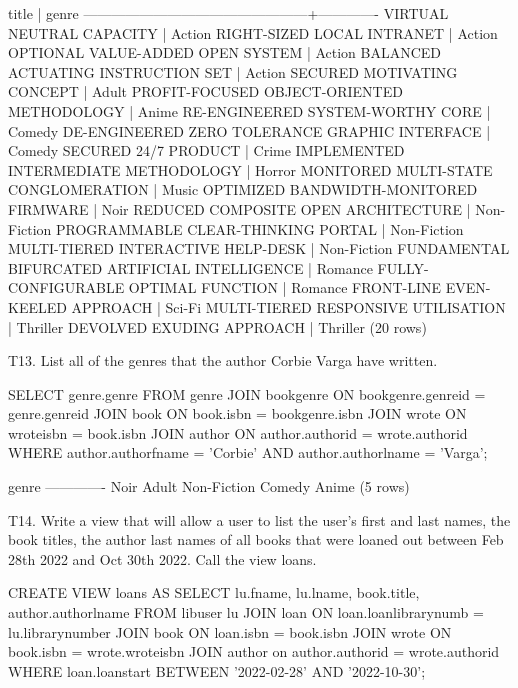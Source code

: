 \begin{pseudo}
                     title                      |    genre
------------------------------------------------+-------------
 VIRTUAL NEUTRAL CAPACITY                       | Action
 RIGHT-SIZED LOCAL INTRANET                     | Action
 OPTIONAL VALUE-ADDED OPEN SYSTEM               | Action
 BALANCED ACTUATING INSTRUCTION SET             | Action
 SECURED MOTIVATING CONCEPT                     | Adult
 PROFIT-FOCUSED OBJECT-ORIENTED METHODOLOGY     | Anime
 RE-ENGINEERED SYSTEM-WORTHY CORE               | Comedy
 DE-ENGINEERED ZERO TOLERANCE GRAPHIC INTERFACE | Comedy
 SECURED 24/7 PRODUCT                           | Crime
 IMPLEMENTED INTERMEDIATE METHODOLOGY           | Horror
 MONITORED MULTI-STATE CONGLOMERATION           | Music
 OPTIMIZED BANDWIDTH-MONITORED FIRMWARE         | Noir
 REDUCED COMPOSITE OPEN ARCHITECTURE            | Non-Fiction
 PROGRAMMABLE CLEAR-THINKING PORTAL             | Non-Fiction
 MULTI-TIERED INTERACTIVE HELP-DESK             | Non-Fiction
 FUNDAMENTAL BIFURCATED ARTIFICIAL INTELLIGENCE | Romance
 FULLY-CONFIGURABLE OPTIMAL FUNCTION            | Romance
 FRONT-LINE EVEN-KEELED APPROACH                | Sci-Fi
 MULTI-TIERED RESPONSIVE UTILISATION            | Thriller
 DEVOLVED EXUDING APPROACH                      | Thriller
(20 rows)
\end{pseudo}

T13. List all of the genres that the author Corbie Varga have written.
\begin{sql}
SELECT genre.genre FROM genre
JOIN bookgenre ON bookgenre.genreid = genre.genreid
JOIN book ON book.isbn = bookgenre.isbn
JOIN wrote ON wroteisbn = book.isbn
JOIN author ON author.authorid = wrote.authorid
WHERE author.authorfname = 'Corbie' AND author.authorlname = 'Varga';
\end{sql}

\begin{pseudo}
    genre
-------------
 Noir
 Adult
 Non-Fiction
 Comedy
 Anime
(5 rows)
\end{pseudo}

T14. Write a view that will allow a user to list the user's first and last names, the book titles, the author last names of all books that were loaned out between Feb 28th 2022 and Oct 30th 2022. Call the view loans.

\begin{sql}
CREATE VIEW loans AS 
SELECT lu.fname, lu.lname, book.title, author.authorlname FROM libuser lu 
JOIN loan ON loan.loanlibrarynumb = lu.librarynumber
JOIN book ON loan.isbn = book.isbn
JOIN wrote ON book.isbn = wrote.wroteisbn
JOIN author on author.authorid = wrote.authorid
WHERE loan.loanstart BETWEEN '2022-02-28' AND '2022-10-30';
\end{sql}

